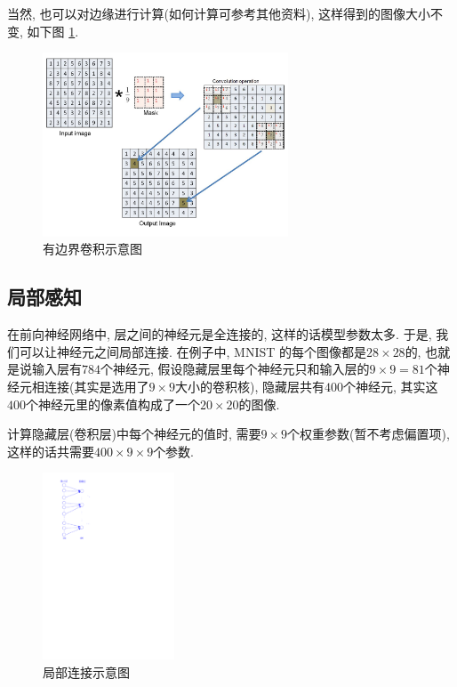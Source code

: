 \documentclass[a4paper,UTF8]{ctexart}
\theoremstyle{plain} \newtheorem{theorem}{定理}[section]
\theoremstyle{plain} \newtheorem{definition}{定义}[section]
\theoremstyle{plain} \newtheorem{lemma}{引理}[section]
\theoremstyle{plain} \newtheorem{proposition}{命题}[section]
\theoremstyle{plain} \newtheorem{example}{例}[section]
\theoremstyle{plain} \newtheorem{remark}{注}[section]
\theoremstyle{plain} \newtheorem{corollary}{推论}[section]
\begin{document}
当然, 也可以对边缘进行计算(如何计算可参考其他资料), 这样得到的图像大小不变, 如下图 \ref{withborder}.
\begin{figure}[!htb]
 	\centering
 	\includegraphics[width=0.65\textwidth]{convolution_fig.jpg}
 	\caption{有边界卷积示意图}
 	\label{withborder}
 \end{figure} 

\subsection{局部感知}
在前向神经网络中, 层之间的神经元是全连接的, 这样的话模型参数太多. 于是, 我们可以让神经元之间局部连接. 在例子中, MNIST 的每个图像都是$28 \times 28$的, 也就是说输入层有$784$个神经元, 假设隐藏层里每个神经元只和输入层的$9 \times 9 = 81$个神经元相连接(其实是选用了$9 \times 9$大小的卷积核), 隐藏层共有$400$个神经元, 其实这$400$个神经元里的像素值构成了一个$20 \times 20$的图像.

计算隐藏层(卷积层)中每个神经元的值时, 需要$9 \times 9$个权重参数(暂不考虑偏置项), 这样的话共需要$400 \times 9 \times 9$个参数.
\begin{figure}[!htb]
    \centering
    \includegraphics[width=0.35\textwidth]{some_neru.pdf}
    \caption{局部连接示意图}
    \label{some-neru}
\end{figure}
\end{document}

